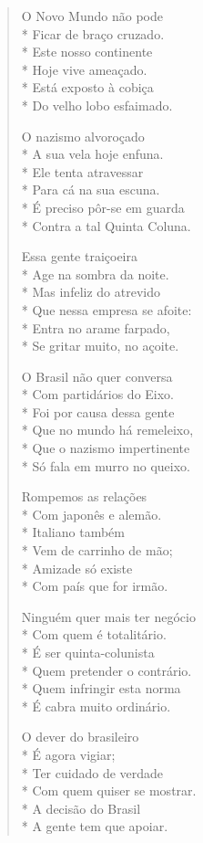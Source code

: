 \begin{verse}
O Novo Mundo não pode\\*
Ficar de braço cruzado.\\*
Este nosso continente\\*
Hoje vive ameaçado.\\*
Está exposto à cobiça\\*
Do velho lobo esfaimado.

O nazismo alvoroçado\\*
A sua vela hoje enfuna.\\*
Ele tenta atravessar\\*
Para cá na sua escuna.\\*
É preciso pôr-se em guarda\\*
Contra a tal Quinta Coluna.

Essa gente traiçoeira\\*
Age na sombra da noite.\\*
Mas infeliz do atrevido\\*
Que nessa empresa se afoite:\\*
Entra no arame farpado,\\*
Se gritar muito, no açoite.

O Brasil não quer conversa\\*
Com partidários do Eixo.\\*
Foi por causa dessa gente\\*
Que no mundo há remeleixo,\\*
Que o nazismo impertinente\\*
Só fala em murro no queixo.

Rompemos as relações\\*
Com japonês e alemão.\\*
Italiano também\\*
Vem de carrinho de mão;\\*
Amizade só existe\\*
Com país que for irmão.

Ninguém quer mais ter negócio\\*
Com quem é totalitário.\\*
É ser quinta-colunista\\*
Quem pretender o contrário.\\*
Quem infringir esta norma\\*
É cabra muito ordinário.

O dever do brasileiro\\*
É agora vigiar;\\*
Ter cuidado de verdade\\*
Com quem quiser se mostrar.\\*
A decisão do Brasil\\*
A gente tem que apoiar.


\end{verse}
